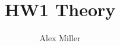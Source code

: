 \documentclass[]{article}
\title{HW1 Theory}
\author{Alex Miller}
\begin{document}
	\maketitle

\begin{abstract}

\end{abstract}

\section{}
\end{document}
